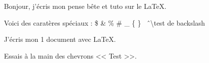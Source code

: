 \documentclass{article}
\begin{document}
Bonjour, j'écris mon pense bête et tuto sur le LaTeX.

Voici des caratères spéciaux : \$ \& \% \# \_ \{ \} \  \^ \ \textbackslash{test de backslash}

J'écris mon 1 document avec \og \LaTeX \fg.

Essais à la main des chevrons << Test >>. %
\end{document}
